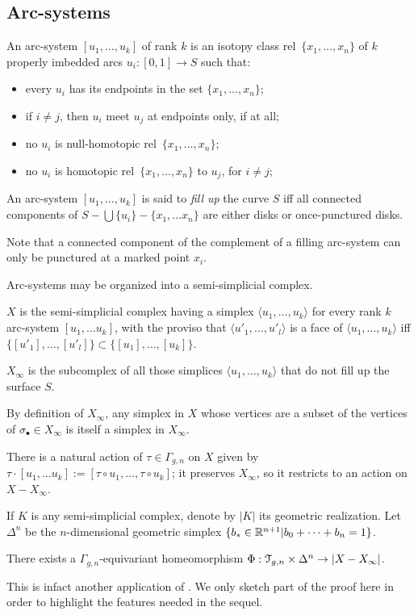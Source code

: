 \subsection{Arc-systems}
\label{sec:arc-systems}

\begin{definition}
  An arc-system $[u_1, \ldots, u_k]$ of rank $k$ is an isotopy class
  rel~$\{x_1, \ldots, x_n\}$ of $k$ properly imbedded arcs $u_i : [0,1] \to S$
  such that:
  \begin{itemize}
  \item every $u_i$ has its endpoints in the set $\{x_1, \ldots, x_n\}$;
  \item if $i \neq j$, then $u_i$ meet $u_j$ at endpoints only, if at all;
  \item no $u_i$ is null-homotopic rel~$\{x_1, \ldots, x_n\}$;
  \item no $u_i$ is homotopic rel~$\{x_1, \ldots, x_n\}$ to $u_j$, for $i \neq
    j$;
  \end{itemize}
  An arc-system $[u_1, \ldots, u_k]$ is said to \emph{fill up} the curve
  $S$ iff all connected components of $S - \bigcup\{u_i\} - \{x_1,\ldots x_n\}$ are
  either disks or once-punctured disks.
\end{definition}
Note that a connected component of the complement of a filling
arc-system can only be punctured at a marked point $x_i$.

Arc-systems may be organized into a semi-simplicial complex.
\begin{definition}
  $X$ is the semi-simplicial complex having a simplex $\langle u_1, \ldots, u_k\rangle$
  for every rank $k$ arc-system $[u_1, \ldots u_k]$, with the proviso that
  $\langle u'_1, \ldots, u'_l\rangle$ is a face of $\langle u_1, \ldots, u_k\rangle$ iff $\{ [u'_1], \ldots,
  [u'_l] \} \subset \{ [u_1], \ldots, [u_k] \}$.
  
  $X_\infty$ is the subcomplex of all those simplices $\langle u_1, \ldots, u_k\rangle$
  that do not fill up the surface $S$.
\end{definition}
By definition of $X_\infty$, any simplex in $X$ whose vertices are a subset
of the vertices of $\sigma_\bullet \in X_\infty$ is itself a simplex in $X_\infty$.

There is a natural action of $\tau \in \Gamma_{g,n}$ on $X$ given by $\tau \cdot [u_1, \ldots
u_k] := [\tau \circ u_1, \ldots, \tau \circ u_k]$; it preserves $X_\infty$, so it restricts to
an action on $X - X_\infty$.

If $K$ is any semi-simplicial complex, denote by $|K|$ its geometric
realization.  Let $\Delta^n$ be the $n$-dimensional geometric
simplex $\{ b_* \in \mathbb{R}^{n+1} | b_0 + \cdots + b_n = 1 \}$.
\begin{theorem}
  \label{thm:H}
  There exists a $\Gamma_{g,n}$-equivariant homeomorphism $\Phi: \mathcal{T}_{g,n} \times
  \Delta^n \to |X - X_\infty|$.
\end{theorem}
This is infact another application of .  We only sketch
part of the proof here in order to highlight the features needed in the
sequel. 

